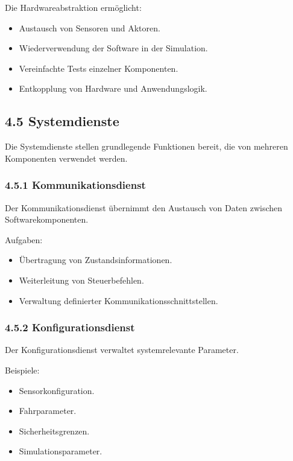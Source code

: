 \documentclass[
  a4paper,
  12pt,
  DIV=12,        %
  parskip=half,  %
  headings=small %
]{scrartcl}
\theoremstyle{definition}
\providecommand{\tightlist}{%
  \setlength{\itemsep}{0pt}\setlength{\parskip}{0pt}}
\theoremstyle{definition}
\providecommand{\tightlist}{%
  \setlength{\itemsep}{0pt}\setlength{\parskip}{0pt}}
\begin{document}
Die Hardwareabstraktion ermöglicht:

\begin{itemize}
\tightlist
\item
  Austausch von Sensoren und Aktoren.
\item
  Wiederverwendung der Software in der Simulation.
\item
  Vereinfachte Tests einzelner Komponenten.
\item
  Entkopplung von Hardware und Anwendungslogik.
\end{itemize}

\subsection{4.5 Systemdienste}\label{systemdienste}

Die Systemdienste stellen grundlegende Funktionen bereit, die von
mehreren Komponenten verwendet werden.

\subsubsection{4.5.1 Kommunikationsdienst}\label{kommunikationsdienst}

Der Kommunikationsdienst übernimmt den Austausch von Daten zwischen
Softwarekomponenten.

Aufgaben:

\begin{itemize}
\tightlist
\item
  Übertragung von Zustandsinformationen.
\item
  Weiterleitung von Steuerbefehlen.
\item
  Verwaltung definierter Kommunikationsschnittstellen.
\end{itemize}

\subsubsection{4.5.2 Konfigurationsdienst}\label{konfigurationsdienst}

Der Konfigurationsdienst verwaltet systemrelevante Parameter.

Beispiele:

\begin{itemize}
\tightlist
\item
  Sensorkonfiguration.
\item
  Fahrparameter.
\item
  Sicherheitsgrenzen.
\item
  Simulationsparameter.
\end{itemize}
\end{document}
